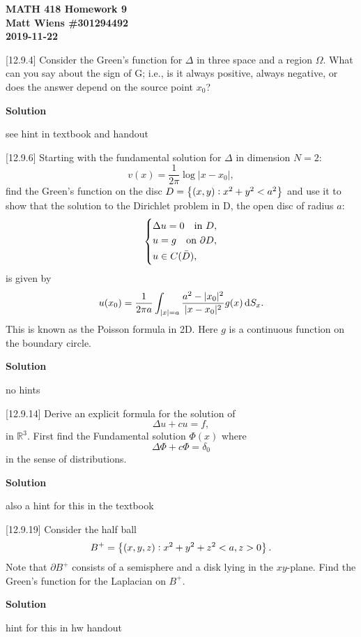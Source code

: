 \documentclass{article}
\begin{document}
\textbf{MATH 418 Homework 9} \\
\textbf{Matt Wiens \#301294492} \\
\textbf{2019-11-22}

[12.9.4] Consider the Green's function for $\Delta$ in three space and a
region $\Omega$. What can you say about the sign of G; i.e., is it
always positive, always negative, or does the answer depend on the
source point $x_0$?

\textbf{Solution}

see hint in textbook and handout

\newpage

[12.9.6] Starting with the fundamental solution for $\Delta$ in
dimension $N = 2$:
%
\begin{equation}
    v(x) = \frac{1}{2 \pi} \log |x - x_0|
    ,
\end{equation}
%
find the Green's function on the disc
$D = \cbr{(x, y): x^2 + y^2 < a^2}$ and use it to show that the solution
to the Dirichlet problem in D, the open disc of radius $a$:
%
\begin{equation*}
    \begin{dcases}
        \Delta u = 0 \quad \text{in } D, \\
        u = g \quad \text{on } \partial D, \\
        u \in C(\bar{D}),
    \end{dcases}
\end{equation*}
%
is given by
%
\begin{equation*}
    u(x_0) = \frac{1}{2 \pi a}
        \int_{|x| = a} \frac{a^2 - |x_0|^2}{|x - x_0|^2} g(x) \dif S_x
        .
\end{equation*}
%
This is known as the Poisson formula in 2D. Here $g$ is a continuous
function on the boundary circle.

\textbf{Solution}

no hints

\newpage

[12.9.14] Derive an explicit formula for the solution of
%
\begin{equation*}
    \Delta u + c u = f
    ,
\end{equation*}
%
in $\mathbb{R}^3$. First find the Fundamental solution $\Phi(x)$ where
%
\begin{equation*}
    \Delta \Phi + c \Phi = \delta_0
\end{equation*}
%
in the sense of distributions.

\textbf{Solution}

also a hint for this in the textbook

\newpage

[12.9.19] Consider the half ball
%
\begin{equation*}
    B^+ = \cbr[1]{(x, y, z): x^2 + y^2 + z^2 < a, z > 0}
    .
\end{equation*}
%
Note that $\partial B^+$ consists of a semisphere and a disk lying in
the $x y$-plane. Find the Green's function for the Laplacian on $B^+$.

\textbf{Solution}

hint for this in hw handout
\end{document}
